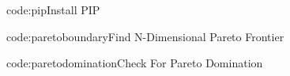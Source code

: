           {code:pip}{Install PIP}

\clearpage
{}
          {code:paretoboundary}{Find N-Dimensional Pareto Frontier}

{}
          {code:paretodomination}{Check For Pareto Domination}

